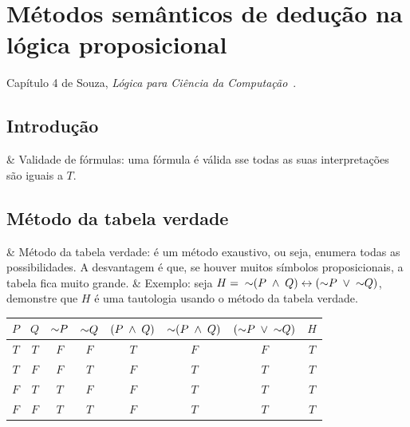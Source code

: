 \chapter{Métodos semânticos de dedução na lógica proposicional}


Capítulo 4 de Souza, \textit{Lógica para Ciência da Computação}~\cite{souza_logica_3}.

\vspace{1cm}


\section{Introdução}

\begin{easylist}
  & Validade de fórmulas: uma fórmula é válida sse todas as suas interpretações são iguais a $T$.
\end{easylist}


\section{Método da tabela verdade}

\begin{easylist}
  & Método da tabela verdade: é um método exaustivo, ou seja, enumera todas as possibilidades. A desvantagem é que, se houver muitos símbolos proposicionais, a tabela fica muito grande.
  & Exemplo: seja $H = \; \mathord{\sim}(P \;\land\; Q) \leftrightarrow (\mathord{\sim} P \;\lor\; \mathord{\sim} Q)$, demonstre que $H$ é uma tautologia usando o método da tabela verdade.  
\end{easylist}

\begin{center}
  \begin{tabular}{ c|c|c|c|c|c|c|c }
    $P$ & $Q$ & $\mathord{\sim} P$ & $\mathord{\sim} Q$ & $(P \;\land\; Q)$ & $\mathord{\sim}(P \;\land\; Q)$ & $(\mathord{\sim} P \;\lor\; \mathord{\sim} Q)$ & $H$ \\
    \hline
    $T$ & $T$ & $F$      & $F$      & $T$          & $F$              & $F$                   & $T$ \\
    $T$ & $F$ & $F$      & $T$      & $F$          & $T$              & $T$                   & $T$ \\
    $F$ & $T$ & $T$      & $F$      & $F$          & $T$              & $T$                   & $T$ \\
    $F$ & $F$ & $T$      & $T$      & $F$          & $T$              & $T$                   & $T$ \\
  \end{tabular}
\end{center}

